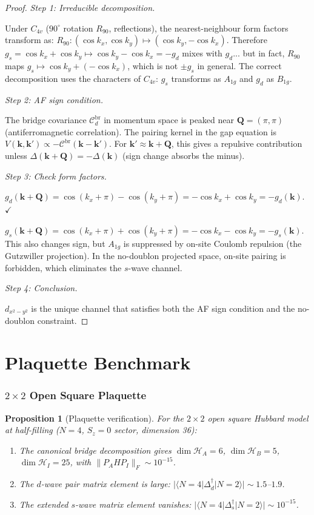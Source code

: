 \documentclass[12pt]{article}
\theoremstyle{plain}
\newtheorem{proposition}[theorem]{Proposition}
\theoremstyle{definition}
\numberwithin{equation}{section}
\newcommand{\br}{\mathrm{br}}
\begin{document}
\begin{proof}
\emph{Step 1: Irreducible decomposition.}

Under $C_{4v}$ ($90^\circ$ rotation $R_{90}$, reflections), the
nearest-neighbour form factors transform as:
$R_{90}:(\cos k_x,\cos k_y)\mapsto(\cos k_y,-\cos k_x)$.
Therefore $g_s=\cos k_x+\cos k_y\mapsto\cos k_y-\cos k_x=-g_d$
mixes with $g_d$... but in fact, $R_{90}$ maps
$g_s\mapsto\cos k_y+(-\cos k_x)$, which is not $\pm g_s$ in
general.  The correct decomposition uses the characters of
$C_{4v}$: $g_s$ transforms as $A_{1g}$ and $g_d$ as $B_{1g}$.

\emph{Step 2: AF sign condition.}

The bridge covariance $\mathcal{C}_d^{\br}$ in momentum space
is peaked near $\bm{Q}=(\pi,\pi)$ (antiferromagnetic correlation).
The pairing kernel in the gap equation is
$V(\bm{k},\bm{k}')\propto -\mathcal{C}^{\br}(\bm{k}-\bm{k}')$.
For $\bm{k}'\approx\bm{k}+\bm{Q}$, this gives a repulsive
contribution unless $\Delta(\bm{k}+\bm{Q})=-\Delta(\bm{k})$
(sign change absorbs the minus).

\emph{Step 3: Check form factors.}

$g_d(\bm{k}+\bm{Q})=\cos(k_x+\pi)-\cos(k_y+\pi)
=-\cos k_x+\cos k_y=-g_d(\bm{k})$.  $\checkmark$

$g_s(\bm{k}+\bm{Q})=\cos(k_x+\pi)+\cos(k_y+\pi)
=-\cos k_x-\cos k_y=-g_s(\bm{k})$.
This also changes sign, but $A_{1g}$ is suppressed by on-site
Coulomb repulsion (the Gutzwiller projection).  In the no-doublon
projected space, on-site pairing is forbidden, which eliminates
the $s$-wave channel.

\emph{Step 4: Conclusion.}

$d_{x^2-y^2}$ is the unique channel that satisfies both the AF
sign condition and the no-doublon constraint.
\end{proof}


\part{Plaquette Benchmark}

\section{$2\times2$ Open Square Plaquette}\label{sec:plaquette}

\begin{proposition}[Plaquette verification]\label{prop:plaquette}
For the $2\times2$ open square Hubbard model at half-filling
($N=4$, $S_z=0$ sector, dimension 36):
\begin{enumerate}[label=(\roman*)]
\item The canonical bridge decomposition gives
$\dim\mathcal{H}_A=6$, $\dim\mathcal{H}_B=5$,
$\dim\mathcal{H}_I=25$, with
$\|P_AHP_I\|_F\sim10^{-15}$.
\item The $d$-wave pair matrix element is large:
$|\langle N\!=\!4|\Delta_d^\dagger|N\!=\!2\rangle|\sim1.5$--$1.9$.
\item The extended $s$-wave matrix element vanishes:
$|\langle N\!=\!4|\Delta_s^\dagger|N\!=\!2\rangle|\sim10^{-15}$.
\end{enumerate}
\end{proposition}
\end{document}
